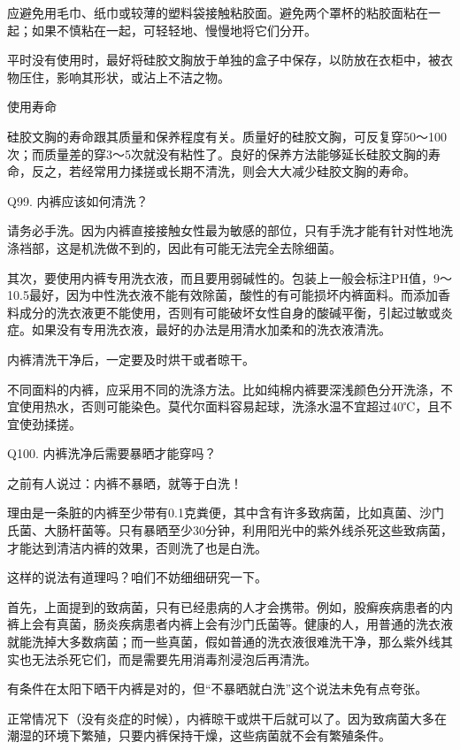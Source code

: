 \documentclass[12pt,UTF8]{ctexbook}
\begin{document}
应避免用毛巾、纸巾或较薄的塑料袋接触粘胶面。避免两个罩杯的粘胶面粘在一起；如果不慎粘在一起，可轻轻地、慢慢地将它们分开。

平时没有使用时，最好将硅胶文胸放于单独的盒子中保存，以防放在衣柜中，被衣物压住，影响其形状，或沾上不洁之物。

使用寿命

硅胶文胸的寿命跟其质量和保养程度有关。质量好的硅胶文胸，可反复穿50～100次；而质量差的穿3～5次就没有粘性了。良好的保养方法能够延长硅胶文胸的寿命，反之，若经常用力揉搓或长期不清洗，则会大大减少硅胶文胸的寿命。





Q99. 内裤应该如何清洗？


请务必手洗。因为内裤直接接触女性最为敏感的部位，只有手洗才能有针对性地洗涤裆部，这是机洗做不到的，因此有可能无法完全去除细菌。

其次，要使用内裤专用洗衣液，而且要用弱碱性的。包装上一般会标注PH值，9～10.5最好，因为中性洗衣液不能有效除菌，酸性的有可能损坏内裤面料。而添加香料成分的洗衣液更不能使用，否则有可能破坏女性自身的酸碱平衡，引起过敏或炎症。如果没有专用洗衣液，最好的办法是用清水加柔和的洗衣液清洗。


内裤清洗干净后，一定要及时烘干或者晾干。

不同面料的内裤，应采用不同的洗涤方法。比如纯棉内裤要深浅颜色分开洗涤，不宜使用热水，否则可能染色。莫代尔面料容易起球，洗涤水温不宜超过40℃，且不宜使劲揉搓。





Q100. 内裤洗净后需要暴晒才能穿吗？


之前有人说过：内裤不暴晒，就等于白洗！

理由是一条脏的内裤至少带有0.1克粪便，其中含有许多致病菌，比如真菌、沙门氏菌、大肠杆菌等。只有暴晒至少30分钟，利用阳光中的紫外线杀死这些致病菌，才能达到清洁内裤的效果，否则洗了也是白洗。

这样的说法有道理吗？咱们不妨细细研究一下。

首先，上面提到的致病菌，只有已经患病的人才会携带。例如，股癣疾病患者的内裤上会有真菌，肠炎疾病患者内裤上会有沙门氏菌等。健康的人，用普通的洗衣液就能洗掉大多数病菌；而一些真菌，假如普通的洗衣液很难洗干净，那么紫外线其实也无法杀死它们，而是需要先用消毒剂浸泡后再清洗。

有条件在太阳下晒干内裤是对的，但“不暴晒就白洗”这个说法未免有点夸张。

正常情况下（没有炎症的时候），内裤晾干或烘干后就可以了。因为致病菌大多在潮湿的环境下繁殖，只要内裤保持干燥，这些病菌就不会有繁殖条件。
\end{document}
